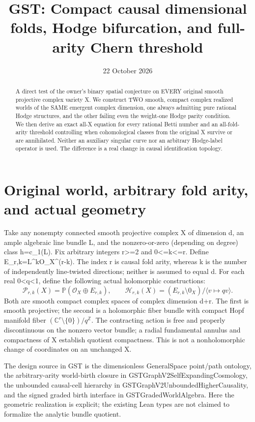 \documentclass[11pt]{article}
\title{GST: Compact causal dimensional folds, Hodge bifurcation, and full-arity Chern threshold}
\date{22 October 2026}
\begin{document}
\maketitle

\begin{abstract}
A direct test of the owner's binary spatial conjecture on EVERY original
smooth projective complex variety X. We construct TWO smooth, compact complex
realized worlds of the SAME emergent complex dimension, one always admitting
pure rational Hodge structures, and the other failing even the weight-one
Hodge parity condition. We then derive an exact all-X equation for every
rational Betti number and an all-fold-arity threshold controlling when
cohomological classes from the original X survive or are annihilated.
Neither an auxiliary singular curve nor an arbitrary Hodge-label operator is
used. The difference is a real change in causal identification topology.
\end{abstract}

\section{Original world, arbitrary fold arity, and actual geometry}
Take any nonempty connected smooth projective complex X of dimension d,
an ample algebraic line bundle L, and the nonzero-or-zero (depending on degree)
class h=c_1(L). Fix arbitrary integers r>=2 and 0<=k<=r.
Define E_{r,k}=L^{\oplus k}\oplus\mathcal O_X^{\oplus(r-k)}.
The index r is causal fold arity, whereas k is the number of independently
line-twisted directions; neither is assumed to equal d.
For each real 0<q<1, define the following actual holomorphic constructions:
\[
 \boxed{\mathcal P_{r,k}(X)=\mathbb P(\mathcal O_X\oplus E_{r,k}),
 \qquad
 \mathcal H_{r,k}(X)=
 (E_{r,k}\setminus 0_X)/\langle v\mapsto qv\rangle.} \tag{1}
\]
Both are smooth compact complex spaces of complex dimension d+r.
The first is smooth projective; the second is a holomorphic
fiber bundle with compact Hopf manifold fiber
$(\mathbb C^r\setminus\{0\})/q^{\mathbb Z}$.
The contracting action is free and properly discontinuous on the
nonzero vector bundle; a radial fundamental annulus and compactness
of X establish quotient compactness. This is not a nonholomorphic
change of coordinates on an unchanged X.

The design source in GST is the dimensionless GeneralSpace point/path ontology,
the arbitrary-arity world-birth closure in GSTGraphV2SelfExpandingCosmology,
the unbounded causal-cell hierarchy in GSTGraphV2UnboundedHigherCausality,
and the signed graded birth interface in GSTGradedWorldAlgebra. Here the
geometric realization is explicit; the existing Lean types are not
claimed to formalize the analytic bundle quotient.
\end{document}
